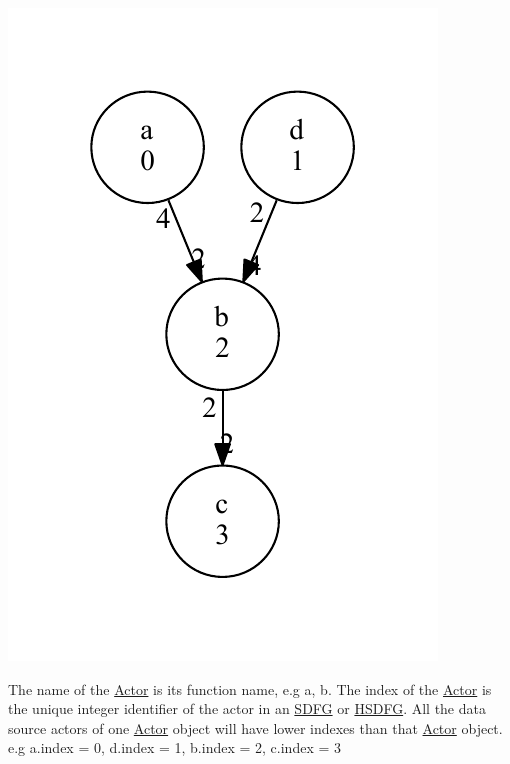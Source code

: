 \begin{DoxyImage}
\includegraphics[width=\textwidth,height=\textheight/2,keepaspectratio=true]{dot_SDFG_example}
\end{DoxyImage}
 The name of the \hyperlink{classsylva_1_1base_1_1sdf_1_1_actor}{Actor} is its function name, e.\+g {\ttfamily a}, {\ttfamily b}. The index of the \hyperlink{classsylva_1_1base_1_1sdf_1_1_actor}{Actor} is the unique integer identifier of the actor in an \hyperlink{classsylva_1_1base_1_1sdf_1_1_s_d_f_g}{S\+D\+FG} or \hyperlink{classsylva_1_1base_1_1sdf_1_1_h_s_d_f_g}{H\+S\+D\+FG}. All the data source actors of one \hyperlink{classsylva_1_1base_1_1sdf_1_1_actor}{Actor} object will have lower indexes than that \hyperlink{classsylva_1_1base_1_1sdf_1_1_actor}{Actor} object. e.\+g {\ttfamily a.\+index = 0}, {\ttfamily d.\+index = 1}, {\ttfamily b.\+index = 2}, {\ttfamily c.\+index = 3} 

